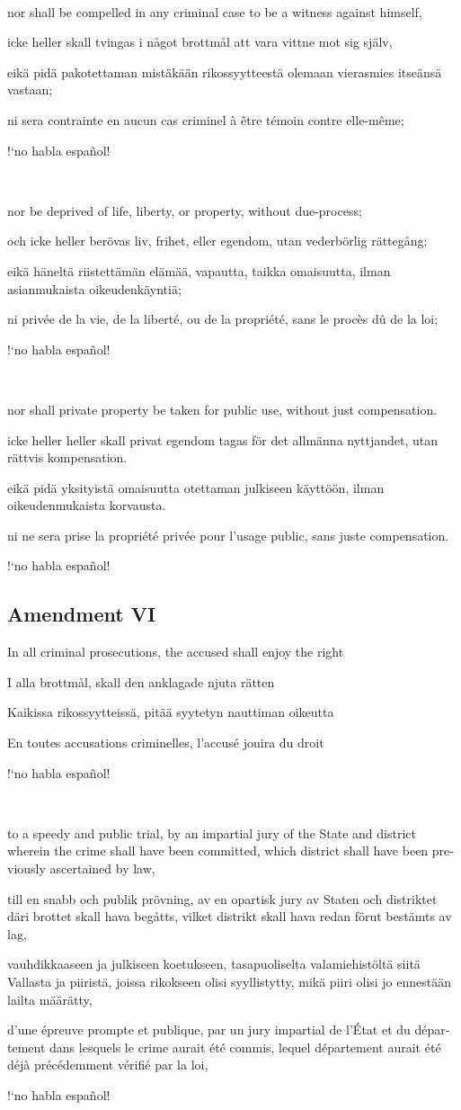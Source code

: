 \documentclass[a4paper,landscape,10pt]{article}
\newcommand{\tblock}[5]{\noindent\begin{minipage}[t]{0.18\textwidth}\foreignlanguage{english}{#1}\end{minipage}\hskip 0.025\textwidth\begin{minipage}[t]{0.18\textwidth}\foreignlanguage{swedish}{#2}\end{minipage}\hskip 0.025\textwidth\begin{minipage}[t]{0.18\textwidth}\foreignlanguage{finnish}{#3}\end{minipage}\hskip 0.025\textwidth\begin{minipage}[t]{0.18\textwidth}\foreignlanguage{french}{#4}\end{minipage}\hskip 0.025\textwidth\begin{minipage}[t]{0.18\textwidth}\foreignlanguage{spanish}{#5}\end{minipage}}
\begin{document}
~

\tblock
{nor shall be compelled in any criminal case to be a witness against himself,}
{icke heller skall tvingas i något brottmål att vara vittne mot sig själv,}
{eikä pidä pakotettaman mistäkään rikossyytteestä olemaan vierasmies itseänsä vastaan;}
{ni sera contrainte en aucun cas criminel à être témoin contre elle-même;}
{!`no habla español!}

~

\tblock
{nor be deprived of life, liberty, or property, without \gls{due-process};}
{och icke heller berövas liv, frihet, eller egendom, utan vederbörlig rättegång;}
{eikä häneltä riistettämän elämää, vapautta, taikka omaisuutta, ilman asianmukaista oikeudenkäyntiä;}
{ni privée de la vie, de la liberté, ou de la propriété, sans le procès dû de la loi;}
{!`no habla español!}

~

\tblock
{nor shall private property be taken for public use, without just compensation.}
{icke heller heller skall privat egendom tagas för det allmänna nyttjandet, utan rättvis kompensation.}
{eikä pidä yksityistä omaisuutta otettaman julkiseen käyttöön, ilman oikeudenmukaista korvausta.}
{ni ne sera prise la propriété privée pour l'usage public, sans juste compensation.}
{!`no habla español!}


\subsection*{Amendment VI}
\tblock
{In all criminal prosecutions, the accused shall enjoy the right}
{I alla brottmål, skall den anklagade njuta rätten}
{Kaikissa rikossyytteissä, pitää syytetyn nauttiman oikeutta}
{En toutes accusations criminelles, l'accusé jouira du droit}
{!`no habla español!}

~

\tblock
{to a speedy and public trial, by an impartial jury of the State and district wherein the crime shall have been committed, which district shall have been previously ascertained by law,}
{till en snabb och publik prövning, av en opartisk jury av Staten och distriktet däri brottet skall hava begåtts, vilket distrikt skall hava redan förut bestämts av lag,}
{vauhdikkaaseen ja julkiseen koetukseen, tasapuoliselta valamiehistöltä siitä Vallasta ja piiristä, joissa rikokseen olisi syyllistytty, mikä piiri olisi jo ennestään lailta määrätty,}
{d'une épreuve prompte et publique, par un jury impartial de l'État et du département dans lesquels le crime aurait été commis, lequel département aurait été déjà précédemment vérifié par la loi,}
{!`no habla español!}
\end{document}

